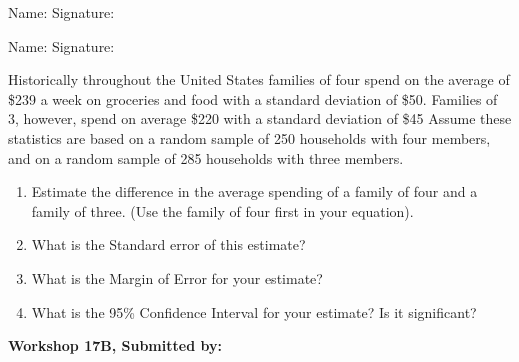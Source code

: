 \documentclass[11pt]{book}\usepackage[]{graphicx}\usepackage[]{color}
\begin{document}
\begin{exercises}
\begin{exercise}
\begin{center}
{{\vspace{4mm}
Name: \underline{\phantom{xxxxxxxxxxxxxxxxxxxxxxxx}} Signature: \underline{\phantom{xxxxxxxxxxxxxxxxxxxxxxxx}}

\vspace{4mm}
Name: \underline{\phantom{xxxxxxxxxxxxxxxxxxxxxxxx}} Signature: \underline{\phantom{xxxxxxxxxxxxxxxxxxxxxxxx}}
 }}
\end{center}

Historically throughout the United States families of four spend on the average of \$239 a week on groceries and food with a standard deviation of \$50. Families of 3, however, spend on average \$220 with a standard deviation of \$45 Assume these statistics are based on a random sample of 250 households with four members, and on a random sample of 285 households with three members.

\begin{enumerate}
\item  Estimate the difference in the average spending of a family of four and a family of three. (Use the family of four first in your equation).
\item  What is the Standard error of this estimate?
\item  What is the Margin of Error for your estimate?
\item  What is the 95\% Confidence Interval for your estimate? Is it significant?
\end{enumerate}

\end{exercise}
\begin{solution}  %

\end{solution}

\clearpage

    \begin{exercise}  %

    \begin{center}
\begin{flushleft}\textbf{\large \hfill Workshop 17B, Submitted by: }\end{flushleft}

\end{center}
\end{exercise}
\end{exercises}
\end{document}
